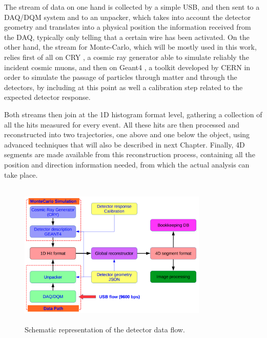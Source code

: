 \documentclass[a4paper, 11pt]{report}
\begin{document}
The stream of data on one hand is collected by a simple USB, and then sent to a DAQ/DQM system and to an unpacker, which takes into account the detector geometry and translates into a physical position the information received from the DAQ, typically only telling that a certain wire has been activated. On the other hand, the stream for Monte-Carlo, which will be mostly used in this work, relies first of all on CRY \cite{CRY}, a cosmic ray generator able to simulate reliably the incident cosmic muons, and then on Geant4 \cite{Geant4}, a toolkit developed by CERN in order to simulate the passage of particles through matter and through the detectors, by including at this point as well a calibration step related to the expected detector response.

Both streams then join at the 1D histogram format level, gathering a collection of all the hits measured for every event. All these hits are then processed and reconstructed into two trajectories, one above and one below the object, using advanced techniques that will also be described in next Chapter. Finally, 4D segments are made available from this reconstruction process, containing all the position and direction information needed, from which the actual analysis can take place.

\begin{figure}[htbp]
\begin{center}
\includegraphics[width=9cm, height=7cm]{figs/dataFlow.png}
\caption{Schematic representation of the detector data flow.}
\label{fig:dataFlow}
\end{center}
\end{figure}
\end{document}
